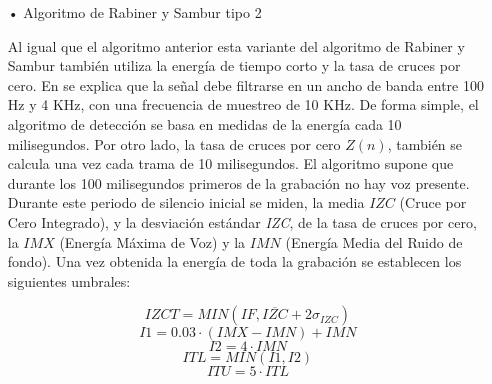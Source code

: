 \begin{enumerate}
\begin{enumerate}
\item[•]Algoritmo de Rabiner y Sambur tipo 2
\par
Al igual que el algoritmo anterior esta variante del algoritmo de Rabiner y Sambur también utiliza la energía de tiempo corto y la tasa de cruces por cero. En \cite{rabiner} se explica que la señal debe filtrarse en un ancho de banda entre 100 Hz y 4 KHz, con una frecuencia de muestreo de 10 KHz. De forma simple, el algoritmo de detección se basa en medidas de la energía cada 10 milisegundos.
\vskip 0.5cm
Por otro lado, la tasa de cruces por cero $Z(n)$, también se calcula una vez cada trama de 10 milisegundos. El algoritmo supone que durante los 100 milisegundos primeros de la grabación no hay voz presente. Durante este periodo de silencio inicial se miden, la media $IZC$ (Cruce por Cero Integrado), y la desviación estándar \textit{IZC}, de la tasa de cruces por cero, la $IMX$ (Energía Máxima de Voz) y la $IMN$ (Energía Media del Ruido de fondo). Una vez obtenida la energía de toda la grabación se establecen los siguientes umbrales:

\begin{equation}
\label{eq:ecuacion27}
IZCT = MIN(IF,\overline{IZC} + 2\sigma _{IZC})
\end{equation}
\vskip -1.5cm
\begin{equation}
\label{eq:ecuacion28}
I1 = 0.03\cdot(IMX-IMN) + IMN
\end{equation}
\vskip -1.5cm
\begin{equation}
\label{eq:ecuacion29}
I2 = 4 \cdot IMN
\end{equation}
\vskip -1.5cm
\begin{equation}
\label{eq:ecuacion30}
ITL = MIN(I1,I2)
\end{equation}
\vskip -1.5cm
\begin{equation}
\label{eq:ecuacion31}
ITU = 5 \cdot ITL
\end{equation}


\end{enumerate}
\end{enumerate}
